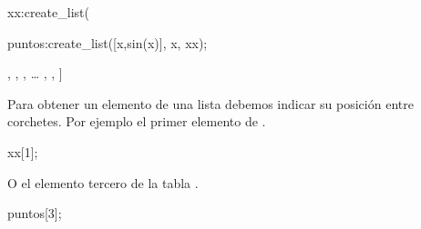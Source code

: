 \begin{maximai}
	xx:create_list(%
\end{maximai}\begin{maximao}
\end{maximao}\begin{maximai}
	puntos:create_list([x,sin(x)], x, xx);
\end{maximai}\begin{maximao}
	\left[ \left[ {{\pi}\over{8}} , \sin \left({{\pi}\over{8}}\right)
	\right]  , 
	,   ,
	\ldots
	,   , \left[ 2\,\pi , 0 \right]  \right]
\end{maximao}

Para obtener un elemento de una lista debemos indicar su posición
entre corchetes. Por ejemplo el primer elemento de .
\begin{maximai}
	xx[1];
\end{maximai}\begin{maximao}
	{{\pi}}
\end{maximao}

O el elemento tercero de la tabla .
\begin{maximai}
	puntos[3];
\end{maximai}\begin{maximao}
\end{maximao}

